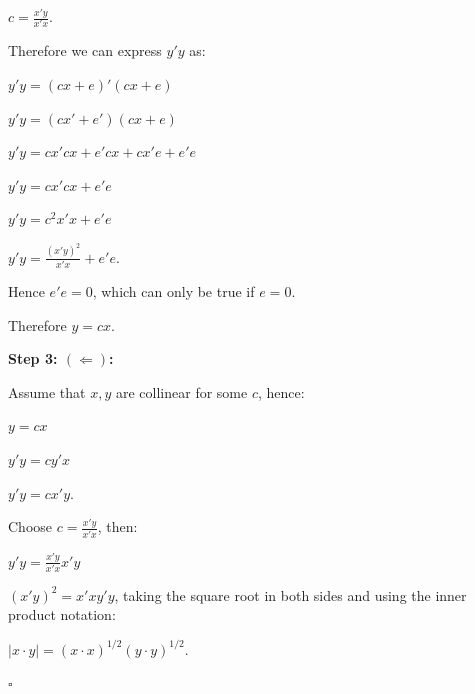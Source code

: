 \documentclass[12pt]{article}
\begin{document}
  $c = \frac{x'y}{x'x}$.

  Therefore we can express $y'y$ as:

  $y'y=(cx+e)'(cx+e)$

  $y'y=(cx'+e')(cx+e)$

  $y'y=cx'cx+e'cx+cx'e+e'e$

  $y'y=cx'cx+e'e$

  $y'y=c^2x'x+e'e$

  $y'y=\frac{(x'y)^2}{x'x}+e'e$.

  Hence $e'e=0$, which can only be true if $e=0$.

  Therefore $y = cx$.

  \textbf{Step 3: $(\Leftarrow)$:}

  Assume that $x,y$ are collinear for some $c$, hence:

  $y = cx$

  $y'y=cy'x$

  $y'y=cx'y$.

  Choose $c = \frac{x'y}{x'x}$, then:

  $y'y=\frac{x'y}{x'x}x'y$

  $(x'y)^2=x'xy'y$, taking the square root in both sides and using the inner product notation:

  $|x \cdot y| = (x \cdot x)^{1/2}(y \cdot y)^{1/2}$.

  $\square$







\end{document}
